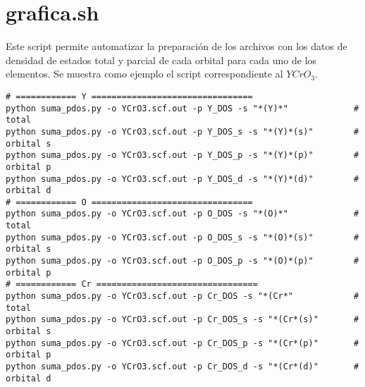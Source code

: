 \section{grafica.sh}

Este script permite automatizar la preparaci\'on de los archivos con los datos de densidad de estados total y parcial de cada orbital para cada uno de los elementos. Se muestra como ejemplo el script correspondiente al $YCrO_{3}$.

\begin{lstlisting}
# ============ Y ================================
python suma_pdos.py -o YCrO3.scf.out -p Y_DOS -s "*(Y)*"             # total
python suma_pdos.py -o YCrO3.scf.out -p Y_DOS_s -s "*(Y)*(s)"        # orbital s
python suma_pdos.py -o YCrO3.scf.out -p Y_DOS_p -s "*(Y)*(p)"        # orbital p
python suma_pdos.py -o YCrO3.scf.out -p Y_DOS_d -s "*(Y)*(d)"        # orbital d
# ============ O ================================
python suma_pdos.py -o YCrO3.scf.out -p O_DOS -s "*(O)*"             # total
python suma_pdos.py -o YCrO3.scf.out -p O_DOS_s -s "*(O)*(s)"        # orbital s
python suma_pdos.py -o YCrO3.scf.out -p O_DOS_p -s "*(O)*(p)"        # orbital p
# ============ Cr ================================
python suma_pdos.py -o YCrO3.scf.out -p Cr_DOS -s "*(Cr*"            # total
python suma_pdos.py -o YCrO3.scf.out -p Cr_DOS_s -s "*(Cr*(s)"       # orbital s
python suma_pdos.py -o YCrO3.scf.out -p Cr_DOS_p -s "*(Cr*(p)"       # orbital p
python suma_pdos.py -o YCrO3.scf.out -p Cr_DOS_d -s "*(Cr*(d)"       # orbital d
\end{lstlisting}